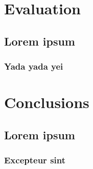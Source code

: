 \documentclass{./llncs2e/llncs}
\begin{document}
% 
% 

\section{Evaluation}

\subsection{Lorem ipsum}

\subsubsection{Yada yada yei}



% 
% 

\section{Conclusions}

\subsection{Lorem ipsum}

\subsubsection{Excepteur sint}










% 
% 




% 
% 

 

\end{document}

